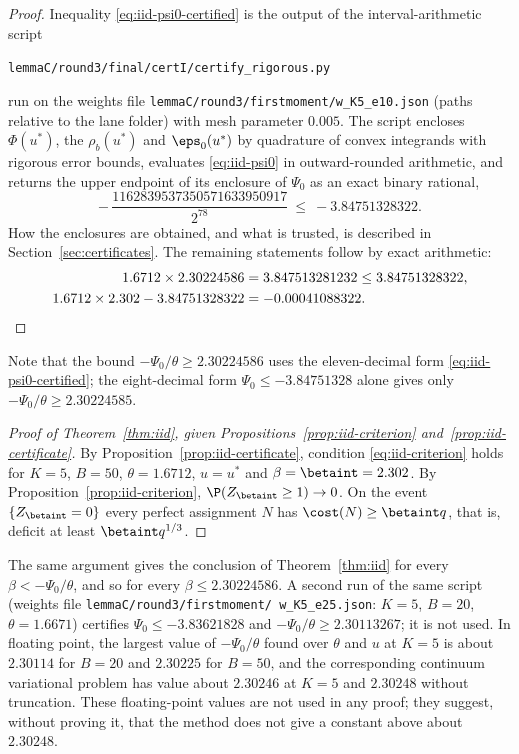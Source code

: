 \begin{proof}
Inequality \eqref{eq:iid-psi0-certified} is the output of the interval-arithmetic script
\begin{center}
\texttt{lemmaC/round3/final/certI/certify\_rigorous.py}
\end{center}
run on the weights file \texttt{lemmaC/round3/firstmoment/w\_K5\_e10.json} (paths
relative to the lane folder) with mesh parameter $0.005$. The script
encloses $\Phi(u^\ast)$, the $\rho_b(u^\ast)$ and $\eps_0(u^\ast)$ by quadrature of convex
integrands with rigorous error bounds, evaluates \eqref{eq:iid-psi0} in outward-rounded
arithmetic, and returns the upper endpoint of its enclosure of $\Psi_0$ as an exact binary
rational,
\[
-\,\frac{1162839537350571633950917}{2^{78}}\ \le\ -3.84751328322 .
\]
How the enclosures are obtained, and what is trusted, is described in
Section~\ref{sec:certificates}. The remaining statements follow by exact arithmetic:
\begin{align*}
1.6712\times2.30224586&=3.847513281232\le3.84751328322,\\
1.6712\times2.302-3.84751328322&=-0.00041088322 .\qedhere
\end{align*}
\end{proof}

Note that the bound $-\Psi_0/\theta\ge2.30224586$ uses the eleven-decimal form
\eqref{eq:iid-psi0-certified}; the eight-decimal form $\Psi_0\le-3.84751328$ alone gives
only $-\Psi_0/\theta\ge2.30224585$.

\begin{proof}[Proof of Theorem~\ref{thm:iid}, given
Propositions~\ref{prop:iid-criterion} and~\ref{prop:iid-certificate}]
By Proposition~\ref{prop:iid-certificate}, condition \eqref{eq:iid-criterion} holds for
$K=5$, $B=50$, $\theta=1.6712$, $u=u^\ast$ and $\beta=\betaint=2.302$. By
Proposition~\ref{prop:iid-criterion}, $\P(Z_{\betaint}\ge1)\to0$. On the event
$\{Z_{\betaint}=0\}$ every perfect assignment $N$ has $\cost(N)\ge\betaint q$, that is,
deficit at least $\betaint q^{1/3}$.
\end{proof}

\begin{remark}\label{rem:iid-values}
The same argument gives the conclusion of Theorem~\ref{thm:iid} for every
$\beta<-\Psi_0/\theta$, and so for every $\beta\le2.30224586$. A second run of the same
script (weights file \texttt{lemmaC/\allowbreak round3/\allowbreak firstmoment/\allowbreak
w\_K5\_e25.json}: $K=5$, $B=20$, $\theta=1.6671$) certifies $\Psi_0\le-3.83621828$ and $-\Psi_0/\theta\ge2.30113267$; it is
not used. In floating point, the largest value of $-\Psi_0/\theta$ found over $\theta$ and $u$ at $K=5$
is about $2.30114$ for $B=20$ and $2.30225$ for $B=50$, and the corresponding continuum
variational problem has value about $2.30246$ at $K=5$ and $2.30248$ without truncation.
These floating-point values are not used in any proof; they suggest, without proving it,
that the method does not give a constant above about $2.30248$.
\end{remark}


